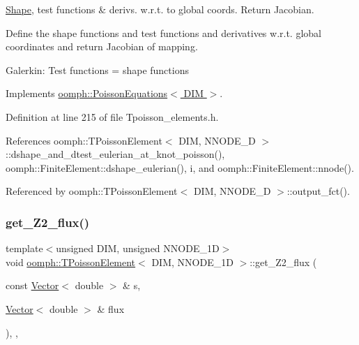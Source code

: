 \hyperlink{classoomph_1_1Shape}{Shape}, test functions \& derivs. w.\+r.\+t. to global coords. Return Jacobian. 

Define the shape functions and test functions and derivatives w.\+r.\+t. global coordinates and return Jacobian of mapping.

Galerkin\+: Test functions = shape functions 

Implements \hyperlink{classoomph_1_1PoissonEquations_a88afb41d8733fb3488754cb579f44770}{oomph\+::\+Poisson\+Equations$<$ D\+I\+M $>$}.



Definition at line 215 of file Tpoisson\+\_\+elements.\+h.



References oomph\+::\+T\+Poisson\+Element$<$ D\+I\+M, N\+N\+O\+D\+E\+\_\+D $>$\+::dshape\+\_\+and\+\_\+dtest\+\_\+eulerian\+\_\+at\+\_\+knot\+\_\+poisson(), oomph\+::\+Finite\+Element\+::dshape\+\_\+eulerian(), i, and oomph\+::\+Finite\+Element\+::nnode().



Referenced by oomph\+::\+T\+Poisson\+Element$<$ D\+I\+M, N\+N\+O\+D\+E\+\_\+D $>$\+::output\+\_\+fct().

\mbox{\label{classoomph_1_1TPoissonElement_adf66ac73ecb1a80c2c86ee01f26f52ae}} 
\subsubsection{\texorpdfstring{get\+\_\+\+Z2\+\_\+flux()}{get\_Z2\_flux()}}
{\footnotesize\ttfamily template$<$unsigned D\+IM, unsigned N\+N\+O\+D\+E\+\_\+1D$>$ \\
void \hyperlink{classoomph_1_1TPoissonElement}{oomph\+::\+T\+Poisson\+Element}$<$ D\+IM, N\+N\+O\+D\+E\+\_\+1D $>$\+::get\+\_\+\+Z2\+\_\+flux (\begin{DoxyParamCaption}\item[{const \hyperlink{classoomph_1_1Vector}{Vector}$<$ double $>$ \&}]{s,  }\item[{\hyperlink{classoomph_1_1Vector}{Vector}$<$ double $>$ \&}]{flux }\end{DoxyParamCaption})\hspace{0.3cm}{\ttfamily [inline]}, {\ttfamily [protected]}, {\ttfamily [virtual]}}



